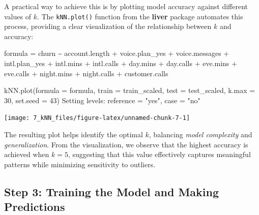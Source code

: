 \documentclass[
  11pt,
]{book}
\makeatletter
\newenvironment{Shaded}{}{}
\newcommand{\AttributeTok}[1]{#1}
\newcommand{\DecValTok}[1]{#1}
\newcommand{\FunctionTok}[1]{#1}
\newcommand{\NormalTok}[1]{#1}
\newcommand{\OtherTok}[1]{\textcolor[rgb]{0.39,0.39,0.39}{#1}}
\newcommand{\SpecialCharTok}[1]{\textcolor[rgb]{0.39,0.39,0.39}{#1}}
\newcommand{\StringTok}[1]{\textcolor[rgb]{0.39,0.39,0.39}{#1}}
\newenvironment{kframe}{%
\medskip{}
\setlength{\fboxsep}{.8em}
 \def\at@end@of@kframe{}%
 \ifinner\ifhmode%
  \def\at@end@of@kframe{\end{minipage}}%
  \begin{minipage}{\columnwidth}%
 \fi\fi%
 \def\FrameCommand##1{\hskip\@totalleftmargin \hskip-\fboxsep
 \colorbox{shadecolor}{##1}\hskip-\fboxsep
     \hskip-\linewidth \hskip-\@totalleftmargin \hskip\columnwidth}%
 \MakeFramed {\advance\hsize-\width
   \@totalleftmargin\z@ \linewidth\hsize
   \@setminipage}}%
 {\par\unskip\endMakeFramed%
 \at@end@of@kframe}
\renewenvironment{Shaded}{\begin{kframe}}{\end{kframe}}
\theoremstyle{definition}
\theoremstyle{definition}
\theoremstyle{definition}
\theoremstyle{definition}
\theoremstyle{remark}
\makeatother
\begin{document}
A practical way to achieve this is by plotting model accuracy against different values of \(k\). The \texttt{kNN.plot()} function from the \textbf{liver} package automates this process, providing a clear visualization of the relationship between \(k\) and accuracy:

\begin{Shaded}
\begin{Highlighting}[]
\NormalTok{formula }\OtherTok{=}\NormalTok{ churn }\SpecialCharTok{\textasciitilde{}}\NormalTok{ account.length }\SpecialCharTok{+}\NormalTok{ voice.plan\_yes }\SpecialCharTok{+}\NormalTok{ voice.messages }\SpecialCharTok{+} 
\NormalTok{                  intl.plan\_yes }\SpecialCharTok{+}\NormalTok{ intl.mins }\SpecialCharTok{+}\NormalTok{ intl.calls }\SpecialCharTok{+} 
\NormalTok{                  day.mins }\SpecialCharTok{+}\NormalTok{ day.calls }\SpecialCharTok{+}\NormalTok{ eve.mins }\SpecialCharTok{+}\NormalTok{ eve.calls }\SpecialCharTok{+} 
\NormalTok{                  night.mins }\SpecialCharTok{+}\NormalTok{ night.calls }\SpecialCharTok{+}\NormalTok{ customer.calls}

\FunctionTok{kNN.plot}\NormalTok{(}\AttributeTok{formula =}\NormalTok{ formula, }\AttributeTok{train =}\NormalTok{ train\_scaled, }\AttributeTok{test =}\NormalTok{ test\_scaled, }
         \AttributeTok{k.max =} \DecValTok{30}\NormalTok{, }\AttributeTok{set.seed =} \DecValTok{43}\NormalTok{)}
\NormalTok{   Setting levels}\SpecialCharTok{:}\NormalTok{ reference }\OtherTok{=} \StringTok{"yes"}\NormalTok{, case }\OtherTok{=} \StringTok{"no"}
\end{Highlighting}
\end{Shaded}

\begin{center}\texttt{[image: 7\_kNN\_files/figure-latex/unnamed-chunk-7-1]} \end{center}

The resulting plot helps identify the optimal \(k\), balancing \emph{model complexity} and \emph{generalization}. From the visualization, we observe that the highest accuracy is achieved when \(k = 5\), suggesting that this value effectively captures meaningful patterns while minimizing sensitivity to outliers.

\subsection{Step 3: Training the Model and Making Predictions}\label{step-3-training-the-model-and-making-predictions}
\end{document}
